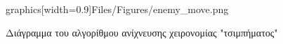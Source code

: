 \begin{figure}[H]
graphics[width=0.9\textwidth]{Files/Figures/enemy_move.png}
    \caption[Διάγραμμα του αλγορίθμου ανίχνευσης χειρονομίας "τσιμπήματος"]{Διάγραμμα του αλγορίθμου ανίχνευσης χειρονομίας "τσιμπήματος"}
    \label{fig:gesture_rec}
\end{figure}


